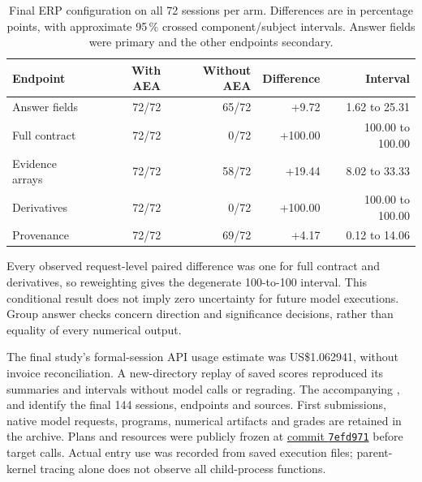 \begin{table}[!htbp]
\centering\small
\caption{Final ERP configuration on all 72 sessions per arm. Differences are in percentage points, with approximate 95\,\% crossed component/subject intervals. Answer fields were primary and the other endpoints secondary.}
\label{tab:erp-paired-configurations}
\begin{tabular}{lrrrr}
\toprule
Endpoint & With AEA & Without AEA & Difference & Interval \\
\midrule
Answer fields & 72/72 & 65/72 & +9.72 & 1.62 to 25.31 \\
Full contract & 72/72 & 0/72 & +100.00 & 100.00 to 100.00 \\
Evidence arrays & 72/72 & 58/72 & +19.44 & 8.02 to 33.33 \\
Derivatives & 72/72 & 0/72 & +100.00 & 100.00 to 100.00 \\
Provenance & 72/72 & 69/72 & +4.17 & 0.12 to 14.06 \\
\bottomrule
\end{tabular}
\par\smallskip
\begin{minipage}{\linewidth}\footnotesize
Every observed request-level paired difference was one for full contract and derivatives, so reweighting gives the degenerate 100-to-100 interval. This conditional result does not imply zero uncertainty for future model executions. Group answer checks concern direction and significance decisions, rather than equality of every numerical output.
\end{minipage}
\end{table}

The final study's formal-session API usage estimate was US\$1.062941, without invoice reconciliation. A new-directory replay of saved scores reproduced its summaries and intervals without model calls or regrading. The accompanying ,  and  identify the final 144 sessions, endpoints and sources. First submissions, native model requests, programs, numerical artifacts and grades are retained in the archive. Plans and resources were publicly frozen at \href{https://github.com/dengzhe-hou/auto-eeg-analysis/tree/7efd971ecc0bc3610ab535894c54fc79f93d6daa/evaluation/erp-entry-20261106}{commit \texttt{7efd971}} before target calls. Actual entry use was recorded from saved execution files; parent-kernel tracing alone does not observe all child-process functions.

\FloatBarrier
{}
